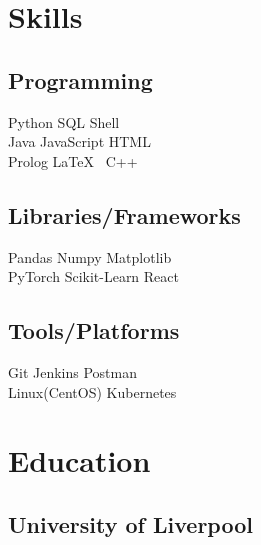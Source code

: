 \documentclass[]{CV}
\begin{document}
\begin{minipage}[t]{0.25\textwidth} 


\section{Skills}
\subsection{Programming}
\sectionsep
{}
Python \textbullet{} SQL \textbullet{} Shell \\
\sectionsep
{}
Java \textbullet{} JavaScript \textbullet{}  HTML  \\
\sectionsep
{}
Prolog \textbullet{}  \LaTeX\ \textbullet{} C++  \\
\sectionsep
\sectionsep
\subsection{Libraries/Frameworks}
\sectionsep
Pandas \textbullet{} Numpy \textbullet{} Matplotlib \\ PyTorch \textbullet{} Scikit-Learn \textbullet{} React \\
\sectionsep
\sectionsep
\subsection{Tools/Platforms}
\sectionsep
Git \textbullet{} Jenkins \textbullet{} Postman  \\ Linux(CentOS) \textbullet{} Kubernetes \\

\sectionsep


\section{Education} 
\subsection{University of Liverpool}


\end{minipage}
\end{document}
